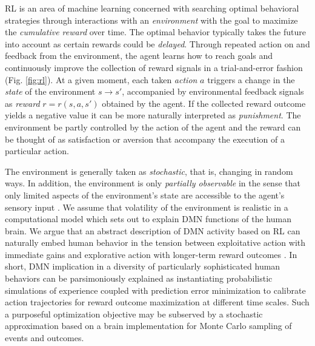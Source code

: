 \documentclass[10pt,letterpaper]{article}
\begin{document}
RL is an area of machine learning concerned with searching optimal behavioral strategies through interactions
with an \textit{environment} with the goal to maximize the \textit{cumulative reward} over time.
The optimal behavior typically
takes the future into account as certain rewards could be \textit{delayed}.
Through repeated action on and feedback from the environment,
the agent learns how to reach goals and continuously improve the collection of reward signals
in a trial-and-error fashion (Fig. \ref{fig:rl}).
At a given moment, each taken \textit{action} $a$ triggers a change
in the \textit{state} of the environment
$s \rightarrow s'$, accompanied by environmental feedback signals as \textit{reward}
$r = r(s, a,s')$ obtained by the agent.
If the collected reward outcome yields a negative value it can be
more naturally interpreted as \textit{punishment}.
The environment be partly controlled by
the action of the agent and the reward can be thought
of as satisfaction \textemdash or aversion \textemdash that accompany the execution of
a particular action.



The environment is generally taken as \textit{stochastic},
that is, changing in random ways. In addition, the environment is only
\textit{partially observable} in the sense that only limited aspects of the environment's
state are accessible to the agent's sensory input
\citep{starkweather2017dopamine}.
We assume that volatility of the environment
is realistic in a computational model which sets out
to explain DMN functions of the human brain.
We argue that an abstract description of DMN activity based on RL
can naturally embed human behavior
in the tension between exploitative action with immediate gains and
explorative action with longer-term reward outcomes
\citep{dayan2008decision}.
In short, DMN implication in a diversity of
particularly sophisticated human behaviors
can be parsimoniously explained as instantiating probabilistic
simulations of experience coupled with prediction error minimization
to calibrate action trajectories for
reward outcome maximization at different time scales.
Such a purposeful optimization objective
may be subserved by a stochastic approximation
based on a brain implementation for Monte Carlo sampling of events and outcomes.
\end{document}
